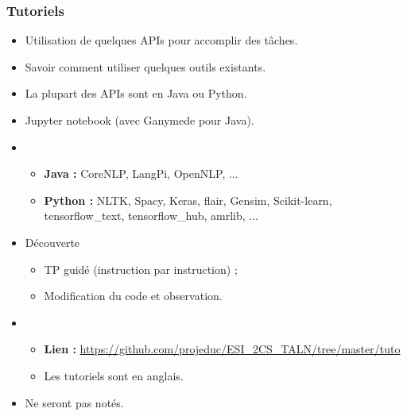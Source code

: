 \documentclass{beamer}
\begin{document}
\begin{frame}
	\frametitle{Tutoriels}
	
	\begin{itemize}
		\item Utilisation de quelques APIs pour accomplir des tâches.
		\item {} Savoir comment utiliser quelques outils existants.
		\item {} La plupart des APIs sont en Java ou Python.
		\item {} Jupyter notebook (avec Ganymede pour Java).
		\item {} 
		\begin{itemize}
			\item \textbf{Java :} CoreNLP, LangPi, OpenNLP, ...
			\item \textbf{Python :} NLTK, Spacy, Keras, flair, Gensim, Scikit-learn, tensorflow\_text, tensorflow\_hub, amrlib, ...
		\end{itemize}
		\item {} Découverte
		\begin{itemize}
			\item TP guidé (instruction par instruction) ; 
			\item Modification du code et observation.
		\end{itemize}
		\item {}
		\begin{itemize}
			\item \textbf{Lien :} {\scriptsize\url{https://github.com/projeduc/ESI_2CS_TALN/tree/master/tuto}}
			\item Les tutoriels sont en anglais.
		\end{itemize}
		\item Ne seront pas notés.
	\end{itemize}
	
\end{frame}
\end{document}
